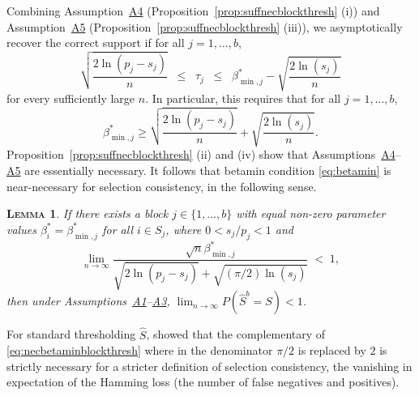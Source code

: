 \documentclass[bj,authoryear]{imsart}
\theoremstyle{plain}
\newtheorem{lem}[thm]{\textsc{Lemma}}
\begin{document}

Combining Assumption~\hyperlink{lab:A4}{A4} (Proposition~\ref{prop:suffnecblockthresh} (i)) and Assumption~\hyperlink{lab:A5}{A5} (Proposition~\ref{prop:suffnecblockthresh} (iii)), we asymptotically recover the correct support if for all $j=1,\ldots,b$,
\begin{equation*}
  \sqrt{\frac{2\ln(p_j-s_j)}{n}}\;\;\leq\;\;\tau_j\;\;\leq\;\;\beta_{\min,j}^*-\sqrt{\frac{2\ln(s_j)}{n}}
\end{equation*}
for every sufficiently large $n$. In particular, this requires that for all $j=1,\ldots,b$,
\begin{equation}\label{eq:betamin}
    \beta_{\min,j}^* \geq \sqrt{\frac{2\ln(p_j-s_j)}{n}} + \sqrt{\frac{2\ln(s_j)}{n}}.
\end{equation}
Proposition~\ref{prop:suffnecblockthresh} (ii) and (iv) show that Assumptions~\hyperlink{lab:A4}{A4}--\hyperlink{lab:A5}{A5} are essentially necessary. It follows that betamin condition \eqref{eq:betamin} is near-necessary for selection consistency, in the following sense.
\begin{lem}\label{lem:necbetaminblockthresh}
    If there exists a block $j\in\{1,\ldots,b\}$ with equal non-zero parameter values $\beta^*_i=\beta_{\min,j}^*$ for all $i \in S_j$, where $0<s_j/p_j<1$ and 
    \begin{equation}\label{eq:necbetaminblockthresh}
        \lim_{n\to \infty}\frac{\sqrt{n}\beta_{\min,j}^*}{\sqrt{2\ln(p_j-s_j)}+\sqrt{(\pi/2)\ln(s_j)}}\;<\; 1,
    \end{equation}
    then under Assumptions~\hyperlink{lab:A1}{A1}--\hyperlink{lab:A3}{A3},\;  $\lim_{n \rightarrow \infty} P(\hat{S}^{b} = S) < 1$.
\end{lem}
For standard thresholding $\hat{S}$, \cite{butucea2018} showed that the complementary of \eqref{eq:necbetaminblockthresh} where in the denominator $\pi/2$ is replaced by $2$ is strictly necessary for a stricter definition of selection consistency, the vanishing in expectation of the Hamming loss (the number of false negatives and positives). 

\smallskip
\end{document}
